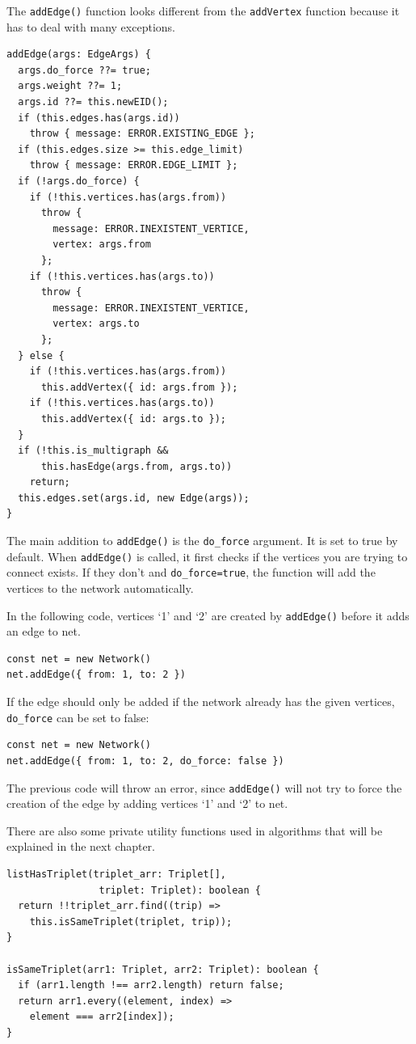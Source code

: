 The \texttt{addEdge()} function looks different from the
\texttt{addVertex} function because it has to deal with many exceptions.

\begin{verbatim}
addEdge(args: EdgeArgs) {
  args.do_force ??= true;
  args.weight ??= 1;
  args.id ??= this.newEID();
  if (this.edges.has(args.id))
    throw { message: ERROR.EXISTING_EDGE };
  if (this.edges.size >= this.edge_limit)
    throw { message: ERROR.EDGE_LIMIT };
  if (!args.do_force) {
    if (!this.vertices.has(args.from))
      throw {
        message: ERROR.INEXISTENT_VERTICE,
        vertex: args.from
      };
    if (!this.vertices.has(args.to))
      throw {
        message: ERROR.INEXISTENT_VERTICE,
        vertex: args.to
      };
  } else {
    if (!this.vertices.has(args.from))
      this.addVertex({ id: args.from });
    if (!this.vertices.has(args.to))
      this.addVertex({ id: args.to });
  }
  if (!this.is_multigraph &&
      this.hasEdge(args.from, args.to))
    return;
  this.edges.set(args.id, new Edge(args));
}
\end{verbatim}

The main addition to \texttt{addEdge()} is the \texttt{do_force} argument.
It is set to true by default.
When \texttt{addEdge()} is called,
it first checks if the vertices you are trying to connect exists.
If they don't and \texttt{do_force=true},
the function will add the vertices to the network automatically.

In the following code, vertices `1' and `2' are created by \texttt{addEdge()}
before it adds an edge to net.

\begin{verbatim}
const net = new Network()
net.addEdge({ from: 1, to: 2 })
\end{verbatim}

If the edge should only be added if the network already has the given vertices,
\texttt{do_force} can be set to false:

\begin{verbatim}
const net = new Network()
net.addEdge({ from: 1, to: 2, do_force: false })
\end{verbatim}

The previous code will throw an error, since \texttt{addEdge()}
will not try to force the creation of the edge by
adding vertices `1' and `2' to net.

There are also some private utility functions used in algorithms
that will be explained in the next chapter.

\begin{verbatim}
listHasTriplet(triplet_arr: Triplet[],
                triplet: Triplet): boolean {
  return !!triplet_arr.find((trip) =>
    this.isSameTriplet(triplet, trip));
}

isSameTriplet(arr1: Triplet, arr2: Triplet): boolean {
  if (arr1.length !== arr2.length) return false;
  return arr1.every((element, index) =>
    element === arr2[index]);
}
\end{verbatim}

